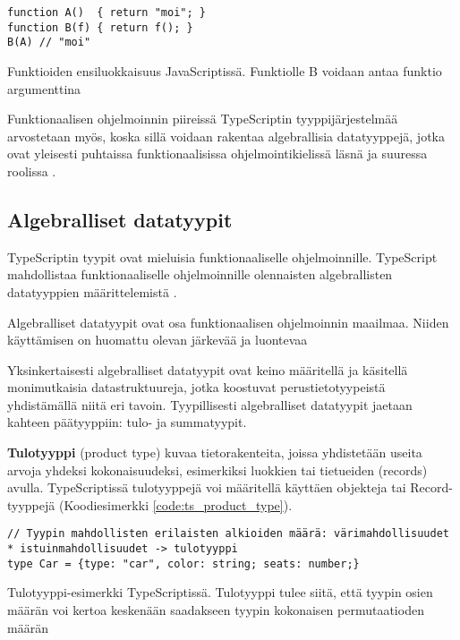 \begin{code}
    \begin{verbatim}
function A()  { return "moi"; }
function B(f) { return f(); }
B(A) // "moi"
\end{verbatim}
    \caption{Funktioiden ensiluokkaisuus JavaScriptissä. Funktiolle B voidaan antaa funktio argumenttina}
    \label{code:js_first_class}
\end{code}

Funktionaalisen ohjelmoinnin piireissä TypeScriptin tyyppijärjestelmää arvostetaan myös, koska sillä voidaan rakentaa algebrallisia datatyyppejä, jotka ovat yleisesti puhtaissa funktionaalisissa ohjelmointikielissä läsnä ja suuressa roolissa \cite{holvikari2021category}.


\subsection{Algebralliset datatyypit}

TypeScriptin tyypit ovat mieluisia funktionaaliselle ohjelmoinnille. TypeScript mahdollistaa funktionaaliselle ohjelmoinnille olennaisten algebrallisten datatyyppien määrittelemistä \cite{holvikari2021category}.

Algebralliset datatyypit ovat osa funktionaalisen ohjelmoinnin maailmaa. Niiden käyttämisen on huomattu olevan järkevää ja luontevaa \cite{holvikari2021category,hickey_maybe_not,algebraic_data_types}

Yksinkertaisesti algebralliset datatyypit ovat keino määritellä ja käsitellä monimutkaisia datastruktuureja, jotka koostuvat perustietotyypeistä yhdistämällä niitä eri tavoin. Tyypillisesti algebralliset datatyypit jaetaan kahteen päätyyppiin: tulo- ja summatyypit.

\textbf{Tulotyyppi} (product type) kuvaa tietorakenteita, joissa yhdistetään useita arvoja yhdeksi kokonaisuudeksi, esimerkiksi luokkien tai tietueiden (records) avulla.
TypeScriptissä tulotyyppejä voi määritellä käyttäen objekteja tai Record-tyyppejä (Koodiesimerkki \ref{code:ts_product_type}). \citep{algebraic_data_types,holvikari2021category}

\begin{code}
    \begin{verbatim}
// Tyypin mahdollisten erilaisten alkioiden määrä: värimahdollisuudet * istuinmahdollisuudet -> tulotyyppi
type Car = {type: "car", color: string; seats: number;}
\end{verbatim}
    \caption{Tulotyyppi-esimerkki TypeScriptissä. Tulotyyppi tulee siitä, että tyypin osien määrän voi kertoa keskenään saadakseen tyypin kokonaisen permutaatioden määrän}
    \label{code:ts_product_type}
\end{code}

